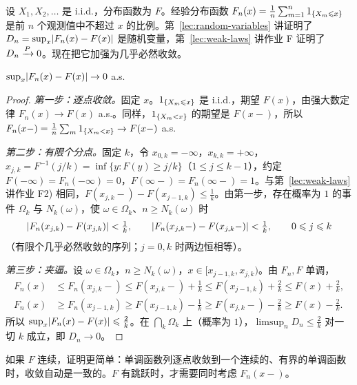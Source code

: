 
设 $X_1,X_2,\dots$ 是 i.i.d.，分布函数为 $F$。经验分布函数 $F_n(x)=\frac1n\sum_{m=1}^n1_{\{X_m\leqslant x\}}$ 是前 $n$ 个观测值中不超过 $x$ 的比例。第~\ref{lec:random-variables} 讲证明了 $D_n=\sup_x\lvert F_n(x)-F(x)\rvert$ 是随机变量，第~\ref{lec:weak-laws} 讲作业 F 证明了 $D_n\xrightarrow{P}0$。现在把它加强为几乎必然收敛。

\begin{theorem}\label{thm:strong-laws:glivenko-cantelli}
$\sup_x\lvert F_n(x)-F(x)\rvert\to0$ a.s.
\end{theorem}
\begin{proof}
\emph{第一步：逐点收敛。}固定 $x$。$1_{\{X_m\leqslant x\}}$ 是 i.i.d.，期望 $F(x)$，由强大数定律 $F_n(x)\to F(x)$ a.s.。同样，$1_{\{X_m<x\}}$ 的期望是 $F(x-)$，所以 $F_n(x-)=\frac1n\sum_m1_{\{X_m<x\}}\to F(x-)$ a.s.

\emph{第二步：有限个分点。}固定 $k$，令 $x_{0,k}=-\infty$，$x_{k,k}=+\infty$，$x_{j,k}=F^{-1}(j/k)=\inf\{y:F(y)\geqslant j/k\}$（$1\leqslant j\leqslant k-1$），约定 $F(-\infty)=F_n(-\infty)=0$，$F(\infty-)=F_n(\infty-)=1$。与第~\ref{lec:weak-laws} 讲作业 F2) 相同，$F(x_{j,k}-)-F(x_{j-1,k})\leqslant\frac1k$。由第一步，存在概率为 $1$ 的事件 $\Omega_k$ 与 $N_k(\omega)$，使 $\omega\in\Omega_k$、$n\geqslant N_k(\omega)$ 时
\[
\lvert F_n(x_{j,k})-F(x_{j,k})\rvert<\tfrac1k,\qquad\lvert F_n(x_{j,k}-)-F(x_{j,k}-)\rvert<\tfrac1k,\qquad0\leqslant j\leqslant k
\]
（有限个几乎必然收敛的序列；$j=0,k$ 时两边恒相等）。

\emph{第三步：夹逼。}设 $\omega\in\Omega_k$，$n\geqslant N_k(\omega)$，$x\in[x_{j-1,k},x_{j,k})$。由 $F_n,F$ 单调，
\[
\begin{aligned}
F_n(x)&\leqslant F_n(x_{j,k}-)\leqslant F(x_{j,k}-)+\tfrac1k\leqslant F(x_{j-1,k})+\tfrac2k\leqslant F(x)+\tfrac2k,\\
F_n(x)&\geqslant F_n(x_{j-1,k})\geqslant F(x_{j-1,k})-\tfrac1k\geqslant F(x_{j,k}-)-\tfrac2k\geqslant F(x)-\tfrac2k .
\end{aligned}
\]
所以 $\sup_x\lvert F_n(x)-F(x)\rvert\leqslant\frac2k$。在 $\bigcap_k\Omega_k$ 上（概率为 $1$），$\limsup_nD_n\leqslant\frac2k$ 对一切 $k$ 成立，即 $D_n\to0$。
\end{proof}

如果 $F$ 连续，证明更简单：单调函数列逐点收敛到一个连续的、有界的单调函数时，收敛自动是一致的。$F$ 有跳跃时，才需要同时考虑 $F_n(x-)$。


